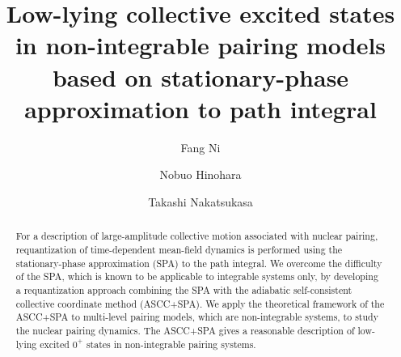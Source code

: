 \documentclass[%
superscriptaddress,
showpacs,
nofootinbib,
amsmath,amssymb,
aps,
prc,
twocolumn,
floatfix ]%
{revtex4-1}
\begin{document}
\renewcommand{\thefootnote}{\fnsymbol{footnote}}

\title{Low-lying collective excited states in non-integrable pairing models
based on stationary-phase approximation to path integral}%

\author{Fang Ni}
\author{Nobuo Hinohara}
\author{Takashi Nakatsukasa}

\begin{abstract}
For a description of large-amplitude collective motion associated with
nuclear pairing, requantization of time-dependent mean-field dynamics
is performed using the stationary-phase approximation (SPA) to the path
integral.
We overcome the difficulty of the SPA, which is known to be applicable to integrable systems only,
by developing a requantization approach combining the SPA with the adiabatic self-consistent collective coordinate method (ASCC+SPA).
We apply the theoretical framework of the ASCC+SPA to 
multi-level pairing models, which are non-integrable systems,
to study the nuclear pairing dynamics.
The ASCC+SPA gives a reasonable description of low-lying excited $0^+$
states in non-integrable pairing systems.
\end{abstract}
\end{document}
